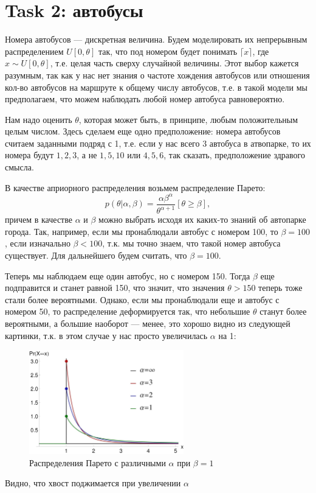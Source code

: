\section{Task 2: автобусы}

\begin{solution}
    Номера автобусов --- дискретная величина. Будем моделировать их непрерывным распределением $U[0, \theta]$ так, что под номером будет понимать $\lceil x \rceil$, где $x \sim U[0, \theta]$, т.е. целая часть сверху случайной величины. Этот выбор кажется разумным, так как у нас нет знания о частоте хождения автобусов или отношения кол-во автобусов на маршруте к общему числу автобусов, т.е. в такой модели мы предполагаем, что можем наблюдать любой номер автобуса равновероятно.

    Нам надо оценить $\theta$, которая может быть, в принципе, любым положительным целым числом. Здесь сделаем еще одно предположение: номера автобусов считаем заданными подряд с 1, т.е. если у нас всего 3 автобуса в атвопарке, то их номера будут $1, 2, 3$, а не $1, 5, 10$ или $4, 5, 6$, так сказать, предположение здравого смысла.

    В качестве априорного распределения возьмем распределение Парето:
    \begin{equation}
        p(\theta | \alpha, \beta) = \frac{\alpha \beta^{\alpha}}{\theta^{\alpha + 1}}[\theta \ge \beta],
    \end{equation}
    причем в качестве $\alpha$ и $\beta$ можно выбрать исходя их каких-то знаний об автопарке города.
    Так, например, если мы пронаблюдали автобус с номером 100, то $\beta=100$, если изначально $\beta < 100$, т.к. мы точно знаем, что такой номер автобуса существует. Для дальнейшего будем считать, что $\beta = 100$.

    Теперь мы наблюдаем еще один автобус, но с номером 150. Тогда $\beta$ еще подправится и станет равной 150, что значит, что значения $\theta > 150$ теперь тоже стали более вероятными. Однако, если мы пронаблюдали еще и автобус с номером 50, то распределение деформируется так, что небольшие $\theta$ станут более вероятными, а большие наоборот --- менее, это хорошо видно из следующей картинки, т.к. в этом случае у нас просто увеличилась $\alpha$ на 1:
    \begin{figure}[H]
        \centering
        \includegraphics[width=0.6\textwidth]{pics/pareto.jpg}
        \caption{Распределения Парето с различными $\alpha$ при $\beta = 1$}
    \end{figure}
    Видно, что хвост поджимается при увеличении $\alpha$


\end{solution}
